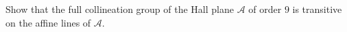 Show that the full collineation group of the Hall plane $\mathcal{A}$ of order $9$ is transitive on the affine lines of $\mathcal{A}$.
